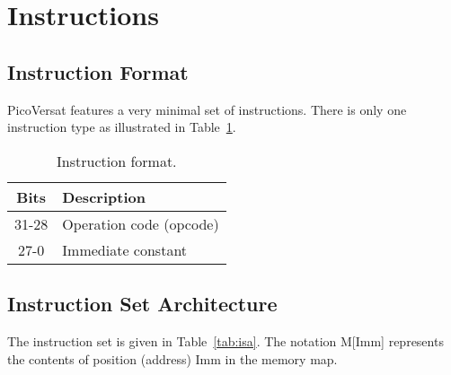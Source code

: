 \section{Instructions}
\label{sec:isa}

\subsection{Instruction Format}

PicoVersat features a very minimal set of instructions. There is only one
instruction type as illustrated in Table~\ref{tab:if}.

\begin{table}[!htbp]
  \centering
    \begin{tabular}{|c|p{7cm}|}
    \hline 
    {\bf Bits} & {\bf Description} \\
    \hline \hline 
     31-28 & Operation code (opcode)\\
    \hline
     27-0 & Immediate constant \\
    \hline

    \end{tabular}
  \caption{Instruction format.}
  \label{tab:if}
\end{table}


\subsection{Instruction Set Architecture}

The instruction set is given in Table~\ref{tab:isa}. The notation M[Imm]
represents the contents of position (address) Imm in the memory map.

